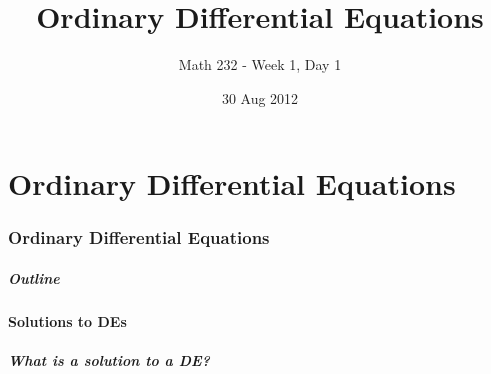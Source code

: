 

\part{Ordinary Differential Equations}
\section{Ordinary Differential Equations}

\title{Ordinary Differential Equations}
\subtitle{Math 232 - Week 1, Day 1}
\date{30 Aug 2012}

\begin{frame}
  \titlepage
\end{frame}

\begin{frame}
  \frametitle{Outline}
\end{frame}


\subsection{Solutions to DEs}


\begin{frame}
  \frametitle{What is a solution to a DE?}


\end{frame}


\begin{frame}
  \frametitle{}


\end{frame}


\begin{frame}
  \frametitle{}


\end{frame}


\begin{frame}
  \frametitle{}


\end{frame}


\begin{frame}
  \frametitle{}


\end{frame}


\begin{frame}
  \frametitle{}


\end{frame}


\begin{frame}
  \frametitle{}


\end{frame}


\begin{frame}
  \frametitle{}


\end{frame}


\begin{frame}
  \frametitle{}


\end{frame}



